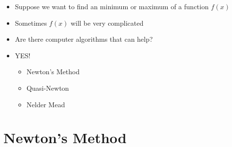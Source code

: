 \documentclass[10pt]{beamer}
\begin{document}
\begin{frame}
  \begin{itemize}
  \item Suppose we want to find an minimum or maximum of a function $f(x)$

  \item Sometimes $f(x)$ will be very complicated

  \item Are there computer algorithms that can help?

  \item YES!

    \begin{itemize}
    \item Newton's Method

    \item Quasi-Newton

    \item Nelder Mead
    \end{itemize}
  \end{itemize}
\end{frame}
\section{Newton's Method}
\end{document}
